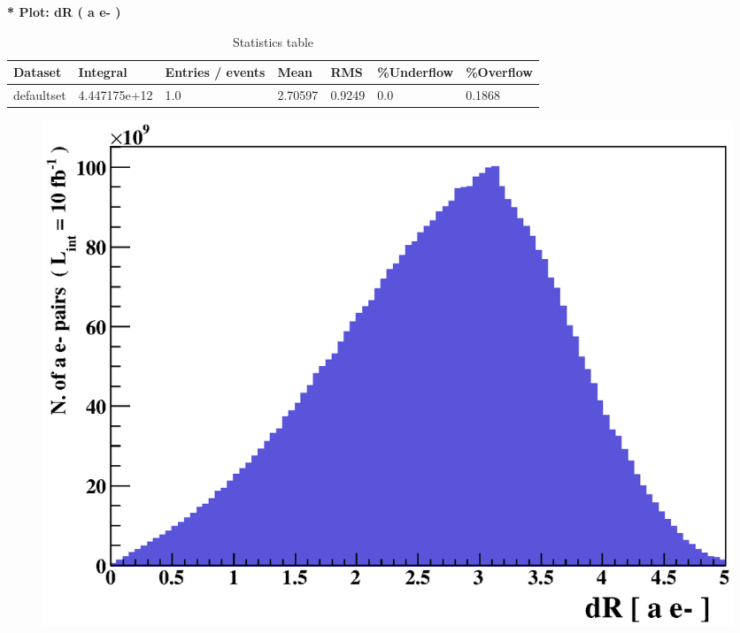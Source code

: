 \documentclass[a4paper, 11pt]{article}
\begin{document}
   \textbf{   * Plot: dR ( a e- ) }
\textbf{ }\begin{table}[!h]
  \begin{center}
    \caption{ Statistics table}
    \begin{tabular}{|m{17.0mm}|m{27.0mm}|m{23.0mm}|m{18.0mm}|m{18.0mm}|m{14.0mm}|m{14.0mm}|}
      \hline
      \cellcolor{yellow}         Dataset& \cellcolor{yellow}         Integral& \cellcolor{yellow}         Entries /\- events& \cellcolor{yellow}         Mean& \cellcolor{yellow}         RMS& \cellcolor{yellow}         \%Underflow& \cellcolor{yellow}         \%Overflow\\
      \hline
      \cellcolor{white}         defaultset& \cellcolor{white}         4.447175e+12& \cellcolor{white}         1.0& \cellcolor{white}         2.70597& \cellcolor{white}         0.9249& \cellcolor{green}         0.0& \cellcolor{green}         0.1868\\
\hline
    \end{tabular}
  \end{center}
\end{table}

\begin{figure}[!h]
  \begin{center}
    \includegraphics[scale=0.6]{selection_0.eps}\\
\caption{}
  \end{center}
\end{figure}
\newpage
   
\end{document}
